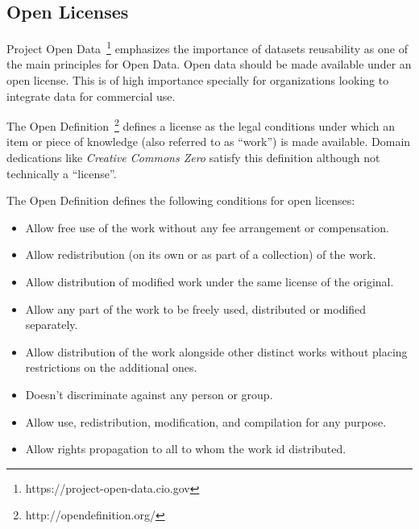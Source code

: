 \subsection{Open Licenses}

Project Open Data~\footnote{https://project-open-data.cio.gov} emphasizes the importance of datasets reusability as one of the main principles for Open Data. Open data should be made available under an open license. This is of high importance specially for organizations looking to integrate data for commercial use.

The Open Definition~\footnote{http://opendefinition.org/} defines a license as the legal conditions under which an item or piece of knowledge (also referred to as ``work'') is made available. Domain dedications like \emph{Creative Commons Zero} satisfy this definition although not technically a ``license''.

The Open Definition defines the following conditions for open licenses:

\begin{itemize}
	\item Allow free use of the work without any fee arrangement or compensation.
	\item Allow redistribution (on its own or as part of a collection) of the work.
	\item Allow distribution of modified work under the same license of the original.
	\item Allow any part of the work to be freely used, distributed or modified separately.
	\item Allow distribution of the work alongside other distinct works without placing restrictions on the additional ones.
	\item Doesn't discriminate against any person or group.
	\item Allow use, redistribution, modification, and compilation for any purpose.
	\item Allow rights propagation to all to whom the work id distributed.
\end{itemize}

\begin{figure}[ht!]
\end{figure}

